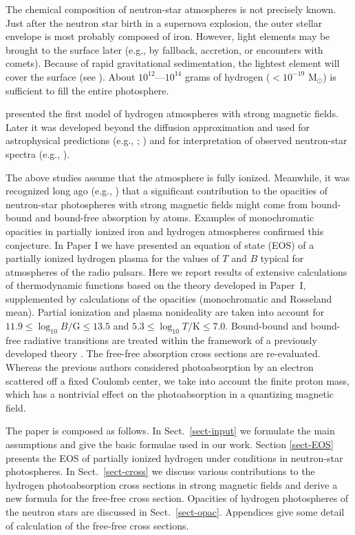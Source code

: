 \documentclass{emulateapj}
\begin{document}
The chemical composition of neutron-star atmospheres is not precisely
known.
Just after the neutron star birth in a supernova explosion,
the outer stellar envelope is most probably composed of iron. 
However, light elements
may be brought to the surface later (e.g., by fallback,
accretion, or encounters with comets).
Because of rapid gravitational sedimentation,
the lightest element will cover the surface
(see \citealp*{Brown02}). 
About $10^{12}$---$10^{14}$ grams
of hydrogen ($<10^{-19}$ M$_\odot$)
is sufficient to fill the entire photosphere. 

\citet{Shib92} presented the first 
model of hydrogen atmospheres with strong magnetic fields.
Later it was developed beyond the diffusion approximation 
\citep{SZ95} 
and used for astrophysical
predictions (e.g., \citealp{Zavlin95};
\citealp*{Zane00,Zane01,HoLai,HoLai02,LaiHo02,Ozel01,Ozel02}) 
and for interpretation
of observed neutron-star spectra
         (e.g., \citealp*{PSZ95,PSZ96,Pavlov95,Ozel-ea}).

The above studies assume that the
atmosphere is fully ionized.
Meanwhile, it was recognized long ago 
(e.g., \citealp{Miller92})
that a significant contribution to the opacities 
of neutron-star photospheres with strong magnetic fields might
come from bound-bound and bound-free absorption by atoms.
Examples of monochromatic opacities 
in partially ionized iron
\citep*{RRM}
and hydrogen \citep*{PCS00}
 atmospheres
 confirmed this conjecture. 
In Paper I we have presented an equation of state (EOS) of a partially
ionized hydrogen plasma for the values of $T$ and $B$
typical for atmospheres of the radio pulsars.
Here we report results of extensive calculations
of thermodynamic functions based on the theory developed in Paper~I,
supplemented by calculations of the opacities
(monochromatic and Rosseland mean). Partial ionization and plasma 
nonideality are taken into account for 
$11.9 \leq \log_{10} B/\mathrm{G} \leq 13.5$ and 
$5.3 \leq \log_{10} T/\mathrm{K} \leq 7.0$.
Bound-bound and bound-free radiative transitions are treated
within the framework of a previously developed theory 
\citep{PP95,PP97}.
The free-free absorption cross sections are re-evaluated.
Whereas the previous authors considered 
photoabsorption by an electron scattered off a fixed Coulomb center,
we take into account the finite proton mass,
which has a nontrivial effect on the photoabsorption 
in a quantizing magnetic field.

The paper is composed as follows. 
In Sect.\ \ref{sect-input} we
formulate the main assumptions and give the basic formulae
used in our work.
Section \ref{sect-EOS} presents the EOS of partially ionized
hydrogen under conditions in neutron-star photospheres.
In Sect.\ \ref{sect-cross} we discuss various contributions
to the hydrogen photoabsorption cross sections 
in strong magnetic fields and derive a new formula for
the free-free cross section.
Opacities of hydrogen photospheres of the neutron stars
are discussed in Sect.\ \ref{sect-opac}.
Appendices give some detail of calculation of the free-free
cross sections.
\end{document}

